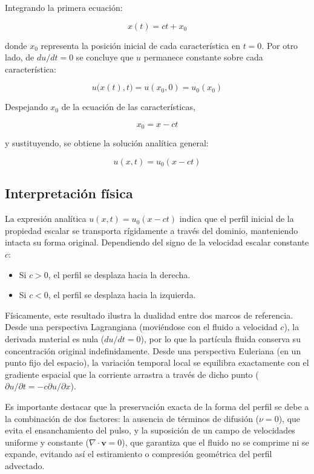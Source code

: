 \documentclass[11pt]{article}
\begin{document}
Integrando la primera ecuación:

$$
x(t)=ct+x_0
$$

donde $x_0$ representa la posición inicial de cada característica en $t=0$. Por otro lado, de $du/dt=0$ se concluye que $u$ permanece constante sobre cada característica:

$$
u\big(x(t),t\big)=u(x_0,0)=u_0(x_0)
$$

Despejando $x_0$ de la ecuación de las características,

$$
x_0=x-ct
$$

y sustituyendo, se obtiene la solución analítica general:

$$
u(x,t)=u_0(x-ct)
$$

\subsection{Interpretación física}

La expresión analítica $u(x,t)=u_0(x-ct)$ indica que el perfil inicial de la propiedad escalar se transporta rígidamente a través del dominio, manteniendo intacta su forma original. Dependiendo del signo de la velocidad escalar constante $c$:
\begin{itemize}
    \item Si $c>0$, el perfil se desplaza hacia la derecha.
    \item Si $c<0$, el perfil se desplaza hacia la izquierda.
\end{itemize}

Físicamente, este resultado ilustra la dualidad entre dos marcos de referencia. Desde una perspectiva Lagrangiana (moviéndose con el fluido a velocidad $c$), la derivada material es nula ($du/dt = 0$), por lo que la partícula fluida conserva su concentración original indefinidamente. Desde una perspectiva Euleriana (en un punto fijo del espacio), la variación temporal local se equilibra exactamente con el gradiente espacial que la corriente arrastra a través de dicho punto ($\partial u/\partial t = -c \partial u/\partial x$).

Es importante destacar que la preservación exacta de la forma del perfil se debe a la combinación de dos factores: la ausencia de términos de difusión ($\nu=0$), que evita el ensanchamiento del pulso, y la suposición de un campo de velocidades uniforme y constante ($\nabla \cdot \mathbf{v} = 0$), que garantiza que el fluido no se comprime ni se expande, evitando así el estiramiento o compresión geométrica del perfil advectado.
\end{document}
